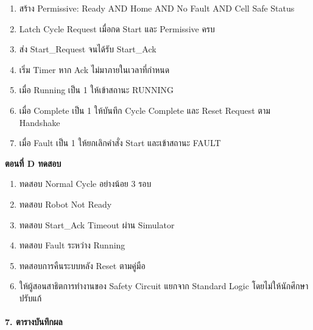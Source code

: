 \begin{enumerate}
    \item สร้าง Permissive: Ready AND Home AND No Fault AND Cell Safe Status
    \item Latch Cycle Request เมื่อกด Start และ Permissive ครบ
    \item ส่ง Start\_Request จนได้รับ Start\_Ack
    \item เริ่ม Timer หาก Ack ไม่มาภายในเวลาที่กำหนด
    \item เมื่อ Running เป็น 1 ให้เข้าสถานะ RUNNING
    \item เมื่อ Complete เป็น 1 ให้บันทึก Cycle Complete และ Reset Request ตาม Handshake
    \item เมื่อ Fault เป็น 1 ให้ยกเลิกคำสั่ง Start และเข้าสถานะ FAULT
\end{enumerate}

\textbf{ตอนที่ D ทดสอบ}

\begin{enumerate}
    \item ทดสอบ Normal Cycle อย่างน้อย 3 รอบ
    \item ทดสอบ Robot Not Ready
    \item ทดสอบ Start\_Ack Timeout ผ่าน Simulator
    \item ทดสอบ Fault ระหว่าง Running
    \item ทดสอบการคืนระบบหลัง Reset ตามคู่มือ
    \item ให้ผู้สอนสาธิตการทำงานของ Safety Circuit แยกจาก Standard Logic โดยไม่ให้นักศึกษาปรับแก้
\end{enumerate}

\paragraph{7. ตารางบันทึกผล}

\begin{table}[htbp]
    \centering
\end{table}

